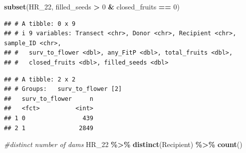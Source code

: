 \documentclass[
]{article}
\newenvironment{Shaded}{\begin{snugshade}}{\end{snugshade}}
\newcommand{\AttributeTok}[1]{\textcolor[rgb]{0.13,0.29,0.53}{#1}}
\newcommand{\CommentTok}[1]{\textcolor[rgb]{0.56,0.35,0.01}{\textit{#1}}}
\newcommand{\DecValTok}[1]{\textcolor[rgb]{0.00,0.00,0.81}{#1}}
\newcommand{\FunctionTok}[1]{\textcolor[rgb]{0.13,0.29,0.53}{\textbf{#1}}}
\newcommand{\NormalTok}[1]{#1}
\newcommand{\OtherTok}[1]{\textcolor[rgb]{0.56,0.35,0.01}{#1}}
\newcommand{\SpecialCharTok}[1]{\textcolor[rgb]{0.81,0.36,0.00}{\textbf{#1}}}
\begin{document}
\begin{Shaded}
\begin{Highlighting}[]
\FunctionTok{subset}\NormalTok{(HR\_22, filled\_seeds }\SpecialCharTok{\textgreater{}} \DecValTok{0} \SpecialCharTok{\&}\NormalTok{ closed\_fruits }\SpecialCharTok{==} \DecValTok{0}\NormalTok{)}
\end{Highlighting}
\end{Shaded}

\begin{verbatim}
## # A tibble: 0 x 9
## # i 9 variables: Transect <chr>, Donor <chr>, Recipient <chr>, sample_ID <chr>,
## #   surv_to_flower <dbl>, any_FitP <dbl>, total_fruits <dbl>,
## #   closed_fruits <dbl>, filled_seeds <dbl>
\end{verbatim}

\begin{Shaded}
\end{Shaded}

\begin{verbatim}
## # A tibble: 2 x 2
## # Groups:   surv_to_flower [2]
##   surv_to_flower     n
##   <fct>          <int>
## 1 0                439
## 2 1               2849
\end{verbatim}

\begin{Shaded}
\begin{Highlighting}[]
\CommentTok{\#distinct number of dams}
\NormalTok{HR\_22 }\SpecialCharTok{\%\textgreater{}\%}
  \FunctionTok{distinct}\NormalTok{(Recipient) }\SpecialCharTok{\%\textgreater{}\%}
  \FunctionTok{count}\NormalTok{()}
\end{Highlighting}
\end{Shaded}
\end{document}
